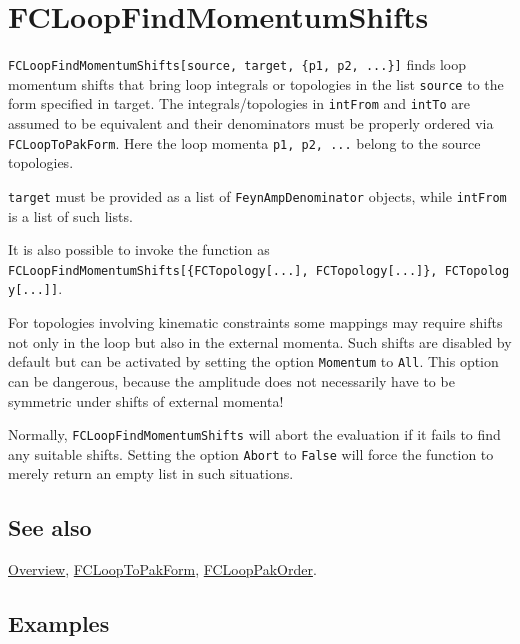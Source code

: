 \documentclass[../FeynCalcManual.tex]{subfiles}
\begin{document}
\hypertarget{fcloopfindmomentumshifts}{
\section{FCLoopFindMomentumShifts}\label{fcloopfindmomentumshifts}}

\texttt{FCLoopFindMomentumShifts[\allowbreak{}source,\ \allowbreak{}target,\ \allowbreak{}\{\allowbreak{}p1,\ \allowbreak{}p2,\ \allowbreak{}...\}]}
finds loop momentum shifts that bring loop integrals or topologies in
the list \texttt{source} to the form specified in target. The
integrals/topologies in \texttt{intFrom} and \texttt{intTo} are assumed
to be equivalent and their denominators must be properly ordered via
\texttt{FCLoopToPakForm}. Here the loop momenta
\texttt{p1,\ \allowbreak{}p2,\ \allowbreak{}...} belong to the source
topologies.

\texttt{target} must be provided as a list of
\texttt{FeynAmpDenominator} objects, while \texttt{intFrom} is a list of
such lists.

It is also possible to invoke the function as
\texttt{FCLoopFindMomentumShifts[\allowbreak{}\{\allowbreak{}FCTopology[\allowbreak{}...],\ \allowbreak{}FCTopology[\allowbreak{}...]\},\ \allowbreak{}FCTopology[\allowbreak{}...]]}.

For topologies involving kinematic constraints some mappings may require
shifts not only in the loop but also in the external momenta. Such
shifts are disabled by default but can be activated by setting the
option \texttt{Momentum} to \texttt{All}. This option can be dangerous,
because the amplitude does not necessarily have to be symmetric under
shifts of external momenta!

Normally, \texttt{FCLoopFindMomentumShifts} will abort the evaluation if
it fails to find any suitable shifts. Setting the option \texttt{Abort}
to \texttt{False} will force the function to merely return an empty list
in such situations.

\subsection{See also}

\hyperlink{toc}{Overview}, \hyperlink{fclooptopakform}{FCLoopToPakForm},
\hyperlink{fclooppakorder}{FCLoopPakOrder}.

\subsection{Examples}
\end{document}
